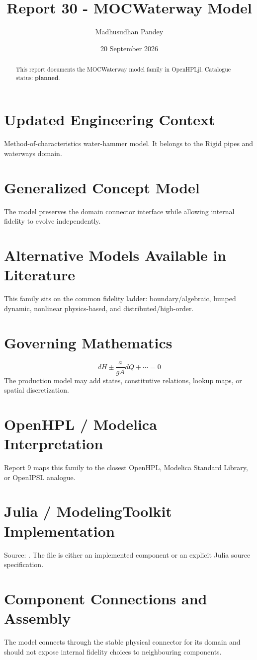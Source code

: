 \documentclass[10pt,a4paper]{article}
\title{Report 30 - MOCWaterway Model}
\author{Madhusudhan Pandey}
\date{20 September 2026}
\begin{document}
\maketitle
\begin{abstract}This report documents the MOCWaterway model family in OpenHPLjl. Catalogue status: \textbf{planned}.\end{abstract}
\section{Updated Engineering Context}Method-of-characteristics water-hammer model. It belongs to the Rigid pipes and waterways domain.
\section{Generalized Concept Model}The model preserves the domain connector interface while allowing internal fidelity to evolve independently.
\section{Alternative Models Available in Literature}This family sits on the common fidelity ladder: boundary/algebraic, lumped dynamic, nonlinear physics-based, and distributed/high-order.
\section{Governing Mathematics}\[dH\pm\frac{a}{gA}dQ+\cdots=0\]The production model may add states, constitutive relations, lookup maps, or spatial discretization.
\section{OpenHPL / Modelica Interpretation}Report 9 maps this family to the closest OpenHPL, Modelica Standard Library, or OpenIPSL analogue.
\section{Julia / ModelingToolkit Implementation}Source: \texttt{}. The file is either an implemented component or an explicit Julia source specification.
\section{Component Connections and Assembly}The model connects through the stable physical connector for its domain and should not expose internal fidelity choices to neighbouring components.
\end{document}
